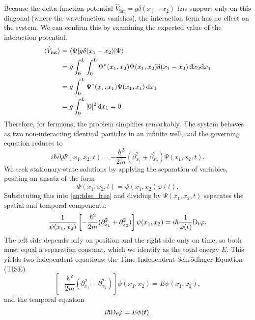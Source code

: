 Because the delta-function potential $\hat{V}_{\text{int}} = g\delta(x_1 - x_2)$
has support only on this diagonal (where the wavefunction vanishes),
the interaction term has no effect on the system.
We can confirm this by examining the expected value of the
interaction potential:
\begin{align} \label{eq:V_int_expectation}
	\braket{\hat{V}_{\text{int}}}
		&= \braket{\Psi | g\delta(x_1 - x_2) | \Psi} \nonumber \\
		&= g \int_{0}^L \int_{0}^L \Psi^*(x_1, x_2)\Psi(x_1, x_2)
		\delta(x_1 - x_2) \, \mathrm{d}x_2 \mathrm{d}x_1 \nonumber \\
		&= g \int_{0}^L \Psi^*(x_1, x_1) \Psi(x_1, x_1) \, \mathrm{d}x_1 \nonumber \\
		&= g \int_{0}^L |0|^2 \, \mathrm{d}x_1 = 0.
\end{align}
Therefore, for fermions, the problem simplifies remarkably. The system
behaves as two non-interacting identical particles in an infinite well,
and the governing equation reduces to
\begin{equation} \label{eq:tdse_free}
	i\hbar\partial_t\Psi(x_1, x_2, t) =
	-\frac{\hbar^2}{2m}\left(\partial_{x_1}^2 + \partial_{x_2}^2\right)
	\Psi(x_1, x_2, t).
\end{equation}
We seek stationary-state solutions by applying the separation of variables,
positing an ansatz of the form
\begin{equation}
	\Psi(x_1, x_2, t) = \psi(x_1, x_2) \varphi(t).
\end{equation}
Substituting this into \cref{eq:tdse_free} and dividing by
$\Psi(x_1, x_2, t)$ separates the spatial and temporal components:
\begin{equation}
	\frac{1}{\psi(x_1, x_2)} \left[
		-\frac{\hbar^2}{2m}(\partial_{x_1}^2 + \partial_{x_2}^2)
	\right] \psi(x_1, x_2)
	= i\hbar \frac{1}{\varphi(t)} \mdv{t}!_{\varphi}.
\end{equation}
The left side depends only on position and the right side only on time,
so both must equal a separation constant, which we identify as the
total energy $E$. This yields two independent equations: the
Time-Independent Schrödinger Equation (TISE)
\begin{equation} \label{eq:tise}
	\left[ -\frac{\hbar^2}{2m} (\partial_{x_1}^2 + \partial_{x_2}^2) \right]
	\psi(x_1, x_2) = E \psi(x_1, x_2),
\end{equation}
and the temporal equation
\begin{equation} \label{eq:time_eq}
	i\hbar \mdv{t}!_{\varphi} = E \phi(t).
\end{equation}

